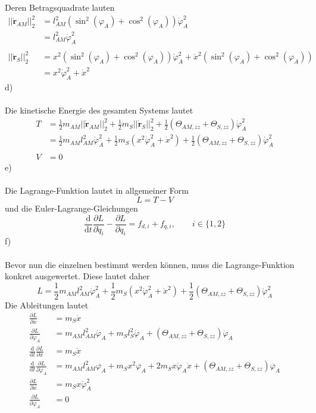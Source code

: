 \newpage
\noindent
Deren Betragsquadrate lauten
\begin{align*}
	||\dot{\textbf{r}}_{AM}||^2_2 &= l^2_{AM}\left(\sin^2(\varphi_A) + \cos^2(\varphi_A)\right)\dot{\varphi}_A^2 \\
				 				  &= l^2_{AM}\dot{\varphi}_A^2 \\ \\
	||\dot{\textbf{r}}_{S}||^2_2 &=	x^2\left(\sin^2(\varphi_A) + \cos^2(\varphi_A)\right)\dot{\varphi}_A^2 + \dot{x}^2\left(\sin^2(\varphi_A) + \cos^2(\varphi_A)\right)	\\
	&= x^2\dot{\varphi}_A^2 + \dot{x}^2
\end{align*}
d)\\ \\
Die kinetische Energie des gesamten Systems lautet
\begin{align*}
	T &= \frac{1}{2}m_{AM}||\dot{\textbf{r}}_{AM}||^2_2 + \frac{1}{2}m_S||\dot{\textbf{r}}_{S}||^2_2 + \frac{1}{2}(\varTheta_{AM,zz} + \varTheta_{S,zz})\dot{\varphi}_A^2 \\
	&= \frac{1}{2}m_{AM}l^2_{AM}\dot{\varphi}_A^2 + \frac{1}{2}m_S\left(x^2\dot{\varphi}_A^2 + \dot{x}^2\right) + \frac{1}{2}(\varTheta_{AM,zz} + \varTheta_{S,zz})\dot{\varphi}_A^2 \\ \\
	V &= 0
\end{align*}
e)\\ \\
Die Lagrange-Funktion lautet in allgemeiner Form
\[
	L = T - V
\]
und die Euler-Lagrange-Gleichungen
\[
	\frac{\text{d}}{\text{d}t}\frac{\partial L}{\partial \dot{q}_i} - \frac{\partial L}{\partial q_i} = f_{d,i} + f_{q,i}, \qquad i\in\{1,2\}
\]
f) \\ \\
Bevor nun die einzelnen bestimmt werden können, muss die Lagrange-Funktion konkret ausgewertet. Diese lautet daher
\[
	L = \frac{1}{2}m_{AM}l^2_{AM}\dot{\varphi}_A^2 + \frac{1}{2}m_S\left(x^2\dot{\varphi}_A^2 + \dot{x}^2\right) + \frac{1}{2}(\varTheta_{AM,zz} + \varTheta_{S,zz})\dot{\varphi}_A^2
\]
\newpage
\noindent
Die Ableitungen lautet
\begin{align*}
	\frac{\partial L}{\partial \dot{x}} &= m_S\dot{x} \\
	\frac{\partial L}{\partial \dot{\varphi}_A} &= m_{AM}l^2_{AM}\dot{\varphi}_A + m_Sl^2_S\dot{\varphi}_A + (\varTheta_{AM,zz} + \varTheta_{S,zz})\dot{\varphi}_A \\
	\frac{\text{d}}{\text{d}t}\frac{\partial L}{\partial \dot{x}} &= m_S\ddot{x} \\
	\frac{\text{d}}{\text{d}t}\frac{\partial L}{\partial \dot{\varphi}_A} &= m_{AM}l^2_{AM}\ddot{\varphi_A} + m_Sx^2\ddot{\varphi_A} + 2m_Sx\dot{\varphi}_A\dot{x} + (\varTheta_{AM,zz} + \varTheta_{S,zz})\ddot{\varphi_A} \\
	\frac{\partial L}{\partial x} &= m_Sx\dot{\varphi}_A^2 \\
	\frac{\partial L}{\partial \varphi_A} &= 0
\end{align*}
